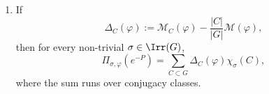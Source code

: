 \begin{theorem}
\begin{enumerate}[label=\textup{(\roman*)}]
\begin{equation}
        +\frac{|C|}{|G|}
          \sum_{\varrho\neq\mathbf 1}
            \chi_\varrho^\ast(C)\Pi_{\varrho,\varphi}(e^{-P}).
      \end{equation}
      In particular,
      \[
        \sum_{n\le N}e^{-Pn}p_{n,C}(\varphi)
        =
        \frac{|C|}{|G|}\log N+\mathcal M_C(\varphi)+O(N^{-1}).
      \]
    \item If
      \[
        \Delta_C(\varphi)
        :=
        \mathcal M_C(\varphi)-\frac{|C|}{|G|}\mathcal M(\varphi),
      \]
      then for every non-trivial \(\sigma\in\Irr(G)\),
      \begin{equation}\label{eq:holder-transfer-fourier}
        \Pi_{\sigma,\varphi}(e^{-P})
        =
        \sum_{C\subset G}\Delta_C(\varphi)\chi_\sigma(C),
      \end{equation}
      where the sum runs over conjugacy classes.
  \end{enumerate}
\end{theorem}

